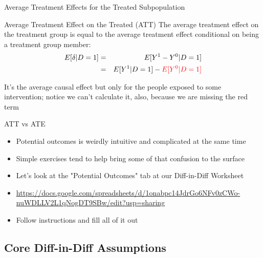 \documentclass{beamer}
\begin{document}
\begin{frame}{Average Treatment Effects for the Treated Subpopulation}	
	\begin{block}{Average Treatment Effect on the Treated (ATT)}
	The average treatment effect on the treatment group is equal to the average treatment effect conditional on being a treatment group member:
		\begin{eqnarray*}
		E[\delta|D=1]&=&E[Y^1-Y^0|D=1] \nonumber \\
		&=&E[Y^1|D=1]-\textcolor{red}{E[Y^0|D=1]}
		\end{eqnarray*}
	\end{block}
	
	\bigskip

It's the average causal effect but only for the people exposed to some intervention; notice we can't calculate it, also, because we are missing the red term

	
\end{frame}

\begin{frame}{ATT vs ATE}

\begin{itemize}
\item Potential outcomes is weirdly intuitive and complicated at the same time
\item Simple exercises tend to help bring some of that confusion to the surface
\item Let's look at the "Potential Outcomes" tab at our Diff-in-Diff Worksheet 
\item \url{https://docs.google.com/spreadsheets/d/1onabpc14JdrGo6NFv0zCWo-nuWDLLV2L1qNogDT9SBw/edit?usp=sharing}
\item Follow instructions and fill all of it out
\end{itemize}

\end{frame}




\subsection{Core Diff-in-Diff Assumptions}
\end{document}
